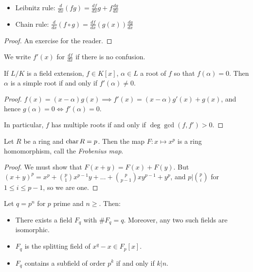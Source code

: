 \documentclass[10pt,a4paper]{article}
\begin{document}
\begin{proposition}
\item
\begin{itemize}
\item{Leibnitz rule}: $\frac{d}{dx}(fg) = \frac{df}{dx}g + f\frac{dg}{dx}$
\item{Chain rule}: $\frac{d}{dx}(f\circ g) = \frac{df}{dx}(g(x))\frac{dg}{dx}$
\end{itemize}
\end{proposition}
\begin{proof}
An exercise for the reader.
\end{proof}
We write $f'(x)$ for $\frac{df}{dx}$ if there is no confusion.

\begin{lemma}
If $L/K$ is a field extension, $f\in K[x]$, $\alpha\in L$ a root of $f$ so that $f(\alpha)=0$. Then $\alpha$ is a simple root if and only if $f'(\alpha) \neq 0$.
\end{lemma}
\begin{proof}
$f(x) = (x-\alpha)g(x) \implies f'(x) = (x-\alpha)g'(x) + g(x)$, and hence $g(\alpha)=0 \iff f'(\alpha) = 0$.

In particular, $f$ has multiple roots if and only if $\deg \gcd(f,f') > 0$.
\end{proof}
\begin{proposition}
Let $R$ be a ring and $\operatorname{char} R = p$. Then the map $F:x \mapsto x^p$ is a ring homomorphism, call the \emph{Frobenius map}.
\end{proposition}
\begin{proof}
We must show that $F(x+y) = F(x) + F(y)$. But $(x+y)^p = x^p + \binom{p}{1} x^{p-1} y + \ldots + \binom{p}{p-1} xy^{p-1} + y^p$, and $p|\binom{p}{i}$ for $1\leq i\leq p-1$, so we are one.
\end{proof}
\begin{theorem}
Let $q=p^n$ for $p$ prime and $n\geq $. Then:
\begin{itemize}
\item There exists a field $F_q$ with $\#F_q = q$. Moreover, any two such fields are isomorphic.
\item $F_q$ is the splitting field of $x^q - x\in F_p[x]$.
\item $F_q$ contains a subfield of order $p^k$ if and only if $k|n$.
\end{itemize}
\end{theorem}
\end{document}
